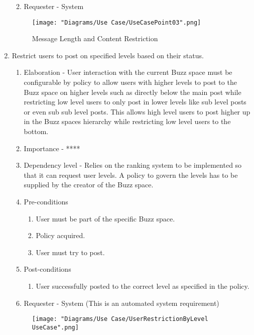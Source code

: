 \documentclass[12pt]{article}
\begin{document}
\begin{enumerate}
\begin{enumerate}
\begin{enumerate}
    \end{enumerate}
    \item Requester - System
  \end{enumerate}
\begin{figure}[h]
  	\centering
  	\texttt{[image: "Diagrams/Use Case/UseCasePoint03".png]}
  	\caption{Message Length and Content Restriction}
  \end{figure}
\newpage %
   \item Restrict users to post on specified levels based on their status. %
  \begin{enumerate}
    \item Elaboration - User interaction with the current Buzz space must be configurable by policy to allow users with higher levels to post to the Buzz space on higher levels such as directly below the main post while restricting low level users to only post in lower levels like sub level posts or even sub sub level posts. This allows high level users to post higher up in the Buzz spaces hierarchy while restricting low level users to the bottom. 
    \item Importance - ****
    \item Dependency level - Relies on the ranking system to be implemented so that it can request user levels. A policy to govern the levels has to be supplied by the creator of the Buzz space.
    \item Pre-conditions
    \begin{enumerate}
    	\item User must be part of the specific Buzz space.
    	\item Policy acquired.
    	\item User must try to post.
    \end{enumerate}
        \item Post-conditions
    \begin{enumerate}
    	\item User successfully posted to the correct level as specified in the policy.
    \end{enumerate}
    \item Requester - System (This is an automated system requirement)
  \end{enumerate}
\begin{figure}[h]
	\centering
	\texttt{[image: "Diagrams/Use Case/UserRestrictionByLevel UseCase".png]}

\end{figure}
\end{enumerate}
\end{document}

